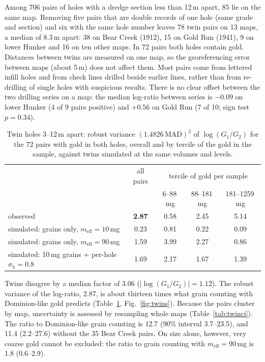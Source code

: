 \documentclass[11pt,a4paper]{article}
\theoremstyle{remark}
\newcommand{\meff}{m_{\mathrm{eff}}}
\begin{document}
Among 706 pairs of holes with a dredge section less than 12\,m apart, 85 lie on the same map. Removing five pairs that are double records of one hole (same grade and section) and six with the same hole number leaves 78 twin pairs on 13 maps, a median of 8.3\,m apart: 38 on Bear Creek (1912), 15 on Gold Run (1941), 9 on lower Hunker and 16 on ten other maps. In 72 pairs both holes contain gold. Distances between twins are measured on one map, so the georeferencing error between maps (about 5\,m) does not affect them. Most pairs come from lettered infill holes and from check lines drilled beside earlier lines, rather than from re-drilling of single holes with suspicious results. There is no clear offset between the two drilling series on a map: the median log-ratio between series is $-0.09$ on lower Hunker (4 of 9 pairs positive) and $+0.56$ on Gold Run (7 of 10; sign test $p = 0.34$).

\begin{table}[t]
\centering
\small
\caption{Twin holes 3--12\,m apart: robust variance $(1.4826\,\mathrm{MAD})^2$ of $\log(G_1/G_2)$ for the 72 pairs with gold in both holes, overall and by tercile of the gold in the sample, against twins simulated at the same volumes and levels.}
\label{tab:twins}
\begin{tabular}{lcccc}
\toprule
 & all pairs & \multicolumn{3}{c}{tercile of gold per sample} \\
 & & 6--88\,mg & 88--181\,mg & 181--1259\,mg \\
\midrule
observed & \textbf{2.87} & 0.58 & 2.45 & 5.14 \\
simulated: grains only, $\meff = 10$\,mg & 0.23 & 0.81 & 0.22 & 0.09 \\
simulated: grains only, $\meff = 90$\,mg & 1.59 & 3.99 & 2.27 & 0.86 \\
simulated: 10\,mg grains + per-hole $\sigma_h = 0.8$ & 1.69 & 2.17 & 1.67 & 1.39 \\
\bottomrule
\end{tabular}
\end{table}

Twins disagree by a median factor of 3.06 ($|\log(G_1/G_2)| = 1.12$). The robust variance of the log-ratio, 2.87, is about thirteen times what grain counting with Dominion-like gold predicts (Table~\ref{tab:twins}, Fig.~\ref{fig:twins}). Because the pairs cluster by map, uncertainty is assessed by resampling whole maps (Table~\ref{tab:twinci}). The ratio to Dominion-like grain counting is 12.7 (90\% interval 3.7--23.5), and 11.4 (2.2--27.6) without the 35 Bear Creek pairs. On size alone, however, very coarse gold cannot be excluded: the ratio to grain counting with $\meff = 90$\,mg is 1.8 (0.6--2.9).
\end{document}
